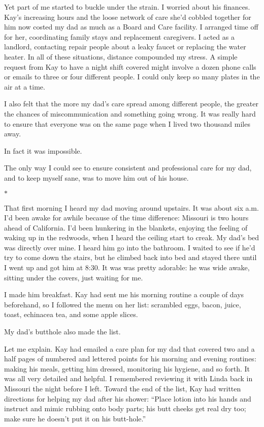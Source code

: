 \documentclass[12pt]{book}
\begin{document}
Yet part of me started to buckle under the strain. I worried about his finances. Kay's increasing hours and the loose network of care she'd cobbled together for him now costed my dad as much as a Board and Care facility. I arranged time off for her, coordinating family stays and replacement caregivers. I acted as a landlord, contacting repair people about a leaky faucet or replacing the water heater. In all of these situations, distance compounded my stress. A simple request from Kay to have a night shift covered might involve a dozen phone calls or emails to three or four different people. I could only keep so many plates in the air at a time.

I also felt that the more my dad's care spread among different people, the greater the chances of miscommunication and something going wrong. It was really hard to ensure that everyone was on the same page when I lived two thousand miles away.

In fact it was impossible.

The only way I could see to ensure consistent and professional care for my dad, and to keep myself sane, was to move him out of his house.

\begin{center}$*$\end{center}

That first morning I heard my dad moving around upstairs. It was about six a.m. I'd been awake for awhile because of the time difference: Missouri is two hours ahead of California. I'd been hunkering in the blankets, enjoying the feeling of waking up in the redwoods, when I heard the ceiling start to creak. My dad's bed was directly over mine. I heard him go into the bathroom. I waited to see if he'd try to come down the stairs, but he climbed back into bed and stayed there until I went up and got him at 8:30. It was was pretty adorable: he was wide awake, sitting under the covers, just waiting for me.

I made him breakfast. Kay had sent me his morning routine a couple of days beforehand, so I followed the menu on her list: scrambled eggs, bacon, juice, toast, echinacea tea, and some apple slices.

My dad's butthole also made the list.

Let me explain. Kay had emailed a care plan for my dad that covered two and a half pages of numbered and lettered points for his morning and evening routines: making his meals, getting him dressed, monitoring his hygiene, and so forth. It was all very detailed and helpful. I remembered reviewing it with Linda back in Missouri the night before I left. Toward the end of the list, Kay had written directions for helping my dad after his shower: ``Place lotion into his hands and instruct and mimic rubbing onto body parts; his butt cheeks get real dry too; make sure he doesn't put it on his butt-hole.''
\end{document}
